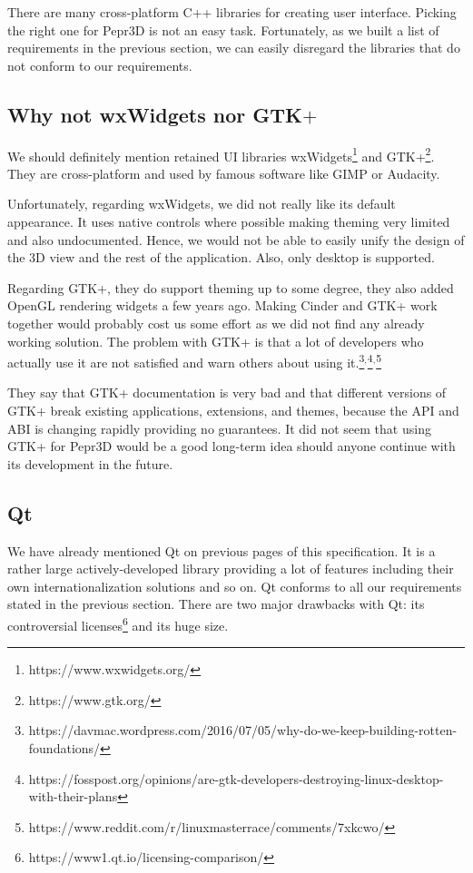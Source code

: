 There are many cross-platform C++ libraries for creating user interface.
Picking the right one for Pepr3D is not an easy task.
Fortunately, as we built a list of requirements in the previous section, we can easily disregard the libraries that do not conform to our requirements.

\subsection{Why not wxWidgets nor GTK$+$}

We should definitely mention retained UI libraries wxWidgets\footnote{https://www.wxwidgets.org/} and GTK+\footnote{https://www.gtk.org/}.
They are cross-platform and used by famous software like GIMP or Audacity.

Unfortunately, regarding wxWidgets, we did not really like its default appearance.
It uses native controls where possible making theming very limited and also undocumented.
Hence, we would not be able to easily unify the design of the 3D view and the rest of the application.
Also, only desktop is supported.

Regarding GTK+, they do support theming up to some degree, they also added OpenGL rendering widgets a few years ago.
Making Cinder and GTK+ work together would probably cost us some effort as we did not find any already working solution.
The problem with GTK+ is that a lot of developers who actually use it are not satisfied and warn others about using it.\footnote{https://davmac.wordpress.com/2016/07/05/why-do-we-keep-building-rotten-foundations/}$^{,}$\footnote{https://fosspost.org/opinions/are-gtk-developers-destroying-linux-desktop-with-their-plans}$^{,}$\footnote{https://www.reddit.com/r/linuxmasterrace/comments/7xkcwo/}

They say that GTK+ documentation is very bad and that different versions of GTK+ break existing applications, extensions, and themes, because the API and ABI is changing rapidly providing no guarantees.
It did not seem that using GTK+ for Pepr3D would be a good long-term idea should anyone continue with its development in the future.

\subsection{Qt}

We have already mentioned Qt on previous pages of this specification.
It is a rather large actively-developed library providing a lot of features including their own internationalization solutions and so on.
Qt conforms to all our requirements stated in the previous section.
There are two major drawbacks with Qt: its controversial licenses\footnote{https://www1.qt.io/licensing-comparison/} and its huge size.

